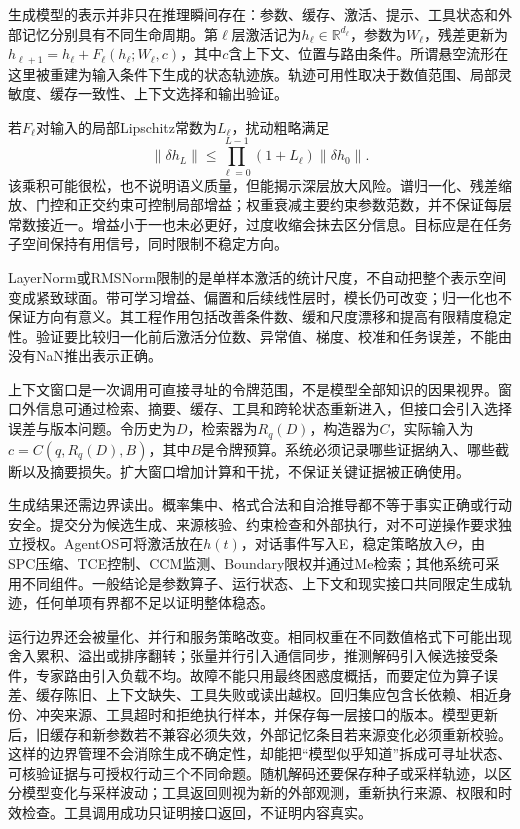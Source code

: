 生成模型的表示并非只在推理瞬间存在：参数、缓存、激活、提示、工具状态和外部记忆分别具有不同生命周期。第$\ell$层激活记为$h_\ell\in\mathbb R^{d_\ell}$，参数为$W_\ell$，残差更新为$h_{\ell+1}=h_\ell+F_\ell(h_\ell;W_\ell,c)$，其中$c$含上下文、位置与路由条件。所谓悬空流形在这里被重建为输入条件下生成的状态轨迹族。轨迹可用性取决于数值范围、局部灵敏度、缓存一致性、上下文选择和输出验证。

若$F_\ell$对输入的局部Lipschitz常数为$L_\ell$，扰动粗略满足
\begin{equation}
\|\delta h_L\|\le\prod_{\ell=0}^{L-1}(1+L_\ell)\|\delta h_0\|.
\end{equation}
该乘积可能很松，也不说明语义质量，但能揭示深层放大风险。谱归一化、残差缩放、门控和正交约束可控制局部增益；权重衰减主要约束参数范数，并不保证每层常数接近一。增益小于一也未必更好，过度收缩会抹去区分信息。目标应是在任务子空间保持有用信号，同时限制不稳定方向。

LayerNorm或RMSNorm限制的是单样本激活的统计尺度，不自动把整个表示空间变成紧致球面。带可学习增益、偏置和后续线性层时，模长仍可改变；归一化也不保证方向有意义。其工程作用包括改善条件数、缓和尺度漂移和提高有限精度稳定性。验证要比较归一化前后激活分位数、异常值、梯度、校准和任务误差，不能由没有NaN推出表示正确。

上下文窗口是一次调用可直接寻址的令牌范围，不是模型全部知识的因果视界。窗口外信息可通过检索、摘要、缓存、工具和跨轮状态重新进入，但接口会引入选择误差与版本问题。令历史为$D$，检索器为$R_q(D)$，构造器为$C$，实际输入为$c=C(q,R_q(D),B)$，其中$B$是令牌预算。系统必须记录哪些证据纳入、哪些截断以及摘要损失。扩大窗口增加计算和干扰，不保证关键证据被正确使用。

生成结果还需边界读出。概率集中、格式合法和自洽推导都不等于事实正确或行动安全。提交分为候选生成、来源核验、约束检查和外部执行，对不可逆操作要求独立授权。AgentOS可将激活放在$h(t)$，对话事件写入E，稳定策略放入$\Theta$，由SPC压缩、TCE控制、CCM监测、Boundary限权并通过Me检索；其他系统可采用不同组件。一般结论是参数算子、运行状态、上下文和现实接口共同限定生成轨迹，任何单项有界都不足以证明整体稳态。

运行边界还会被量化、并行和服务策略改变。相同权重在不同数值格式下可能出现舍入累积、溢出或排序翻转；张量并行引入通信同步，推测解码引入候选接受条件，专家路由引入负载不均。故障不能只用最终困惑度概括，而要定位为算子误差、缓存陈旧、上下文缺失、工具失败或读出越权。回归集应包含长依赖、相近身份、冲突来源、工具超时和拒绝执行样本，并保存每一层接口的版本。模型更新后，旧缓存和新参数若不兼容必须失效，外部记忆条目若来源变化必须重新校验。这样的边界管理不会消除生成不确定性，却能把“模型似乎知道”拆成可寻址状态、可核验证据与可授权行动三个不同命题。随机解码还要保存种子或采样轨迹，以区分模型变化与采样波动；工具返回则视为新的外部观测，重新执行来源、权限和时效检查。工具调用成功只证明接口返回，不证明内容真实。

